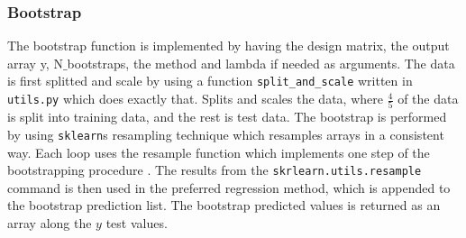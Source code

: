\documentclass[../main.tex]{subfiles}
\begin{document}
\subsubsection{Bootstrap}
The bootstrap function is implemented by having the design matrix, the output array y, N$\_$bootstraps, the method and lambda if needed as arguments. The data is first splitted and scale by using a function \verb|split_and_scale| written in \verb|utils.py| which does exactly that. Splits and scales the data, where $\frac{4}{5}$ of the data is split into training data, and the rest is test data. The bootstrap is performed by using \verb|sklearn|s resampling technique which resamples arrays in a consistent way. Each loop uses the resample function which implements one step of the bootstrapping procedure \cite{scikitlearn}. The results from the \verb|skrlearn.utils.resample| command is then used in the preferred regression method, which is appended to the bootstrap prediction list. The bootstrap predicted values is returned as an array along the $y$ test values.
\end{document}
